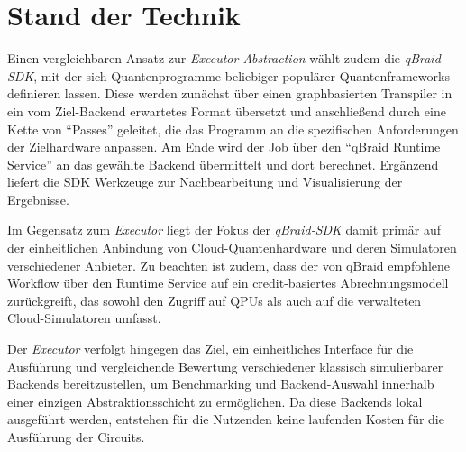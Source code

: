 \section{Stand der Technik}
\label{sec:related_work}

Einen vergleichbaren Ansatz zur \textit{Executor Abstraction} wählt zudem die
\textit{qBraid-SDK}, mit der sich Quantenprogramme beliebiger populärer
Quantenframeworks definieren lassen. Diese werden zunächst über einen
graphbasierten Transpiler in ein vom Ziel-Backend erwartetes Format
übersetzt und anschließend durch eine Kette von \enquote{Passes} geleitet,
die das Programm an die spezifischen Anforderungen der Zielhardware
anpassen. Am Ende wird der Job über den \enquote{qBraid Runtime Service}
an das gewählte Backend übermittelt und dort berechnet. Ergänzend liefert
die SDK Werkzeuge zur Nachbearbeitung und Visualisierung der Ergebnisse.

Im Gegensatz zum \textit{Executor} liegt der Fokus der \textit{qBraid-SDK}
damit primär auf der einheitlichen Anbindung von Cloud-Quantenhardware
und deren Simulatoren verschiedener Anbieter. Zu beachten ist zudem, dass
der von qBraid empfohlene Workflow über den Runtime Service auf ein
credit-basiertes Abrechnungsmodell zurückgreift, das sowohl den
Zugriff auf QPUs als auch auf die verwalteten Cloud-Simulatoren umfasst. 

Der
\textit{Executor} verfolgt hingegen das Ziel, ein einheitliches Interface
für die Ausführung und vergleichende Bewertung verschiedener klassisch
simulierbarer Backends bereitzustellen, um Benchmarking und
Backend-Auswahl innerhalb einer einzigen Abstraktionsschicht zu
ermöglichen. Da diese Backends lokal ausgeführt werden, entstehen für die
Nutzenden keine laufenden Kosten für die Ausführung der Circuits.
